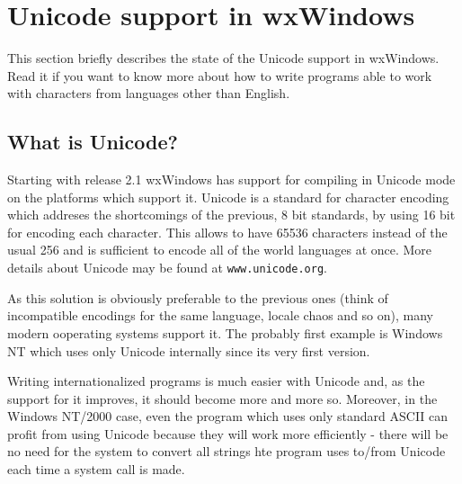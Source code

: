 
\section{Unicode support in wxWindows}\label{unicode}

This section briefly describes the state of the Unicode support in wxWindows.
Read it if you want to know more about how to write programs able to work with
characters from languages other than English.

\subsection{What is Unicode?}

Starting with release 2.1 wxWindows has support for compiling in Unicode mode
on the platforms which support it. Unicode is a standard for character
encoding which addreses the shortcomings of the previous, 8 bit standards, by
using 16 bit for encoding each character. This allows to have 65536 characters
instead of the usual 256 and is sufficient to encode all of the world
languages at once. More details about Unicode may be found at {\tt www.unicode.org}.


As this solution is obviously preferable to the previous ones (think of
incompatible encodings for the same language, locale chaos and so on), many
modern ooperating systems support it. The probably first example is Windows NT
which uses only Unicode internally since its very first version.

Writing internationalized programs is much easier with Unicode and, as the
support for it improves, it should become more and more so. Moreover, in the
Windows NT/2000 case, even the program which uses only standard ASCII can profit
from using Unicode because they will work more efficiently - there will be no
need for the system to convert all strings hte program uses to/from Unicode
each time a system call is made.

